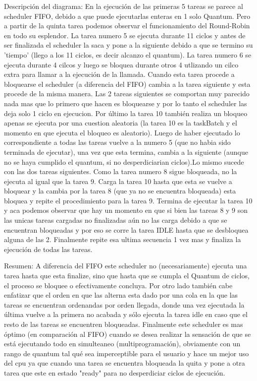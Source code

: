 Descripción del diagrama:
En la ejecución de las primeras 5 tareas se parece al scheduler FIFO, debido a que puede ejecutarlas enteras en 1 solo Quantum. Pero a partir de la quinta tarea podemos observar el funcionamiento del Round-Robin en todo su esplendor.
La tarea numero 5 se ejecuta durante 11 ciclos y antes de ser finalizada el scheduler la saca y pone a la siguiente debido a que se termino su 'tiempo' (llego a los 11 ciclos, es decir alcanzo el quantum).
La tarea numero 6 se ejecuta durante 4 cilcos y luego se bloquea durante otros 4 utlizando un cilco extra para llamar a la ejecución de la llamada. Cuando esta tarea procede a bloquearse el scheduler (a diferencia del FIFO) cambia a la tarea siguiente y esta procede de la misma manera.
Las 2 tareas siguientes se comportan muy parecido nada mas que lo primero que hacen es bloquearse y por lo tanto el scheduler las deja solo 1 ciclo en ejecucion.
Por último la tarea 10 también realiza un bloqueo apenas se ejecuta por una cuestion aleatoria (la tarea 10 es la taskBatch y el momento en que ejecuta el bloqueo es aleatorio).
Luego de haber ejecutado lo correspondiente a todas las tareas vuelve a la numero 5 (que no habia sido terminada de ejecutar), una vez que esta termina, cambia a la siguiente (aunque no se haya cumplido el quantum, si no desperdiciarian ciclos).Lo mismo sucede con las dos tareas siguientes.
Como la tarea numero 8 sigue bloqueada, no la ejecuta al igual que la tarea 9.
Carga la tarea 10 hasta que esta se vuelve a bloquear y la cambia por la tarea 8 (que ya no se encuentra bloqueada) esta bloquea y repite el procedimiento para la tarea 9. 
Termina de ejecutar la tarea 10 y aca podemos observar que hay un momento en que si bien las tareas 8 y 9 son las unicas tareas cargadas no finalizadas aún no las carga debido a que se encuentran bloqueadas y por eso se corre la tarea IDLE hasta que se desbloquea alguna de las 2.
Finalmente repite esa ultima secuencia 1 vez mas y finaliza la ejecución de todas las tareas.

Resumen:
A diferencia del FIFO este scheduler no (necesariamente) ejecuta una tarea hasta que esta finalize, sino que hasta que se cumpla el Quantum de ciclos, el proceso se bloquee o efectivamente concluya. Por otro lado también cabe enfatizar que el orden en que las alterna esta dado por una cola en la que las tareas se encuentran ordenandas por orden llegada, donde una vez ejecutada la última vuelve a la primera no acabada y sólo ejecuta la tarea idle en caso que el resto de las tareas se encuentren bloqueadas.
Finalmente este scheduler es mas óptimo (en comparación al FIFO) cuando se desea realizar la sensación de que se está ejecutando todo en simulteaneo (multiprogramación), obviamente con un rango de quantum tal qué sea imperceptible para el usuario y hace un mejor uso del cpu ya que cuando una tarea se encuentra bloqueada la quita y pone a otra tarea que este en estado "ready" para no desperdiciar ciclos de ejecución.
